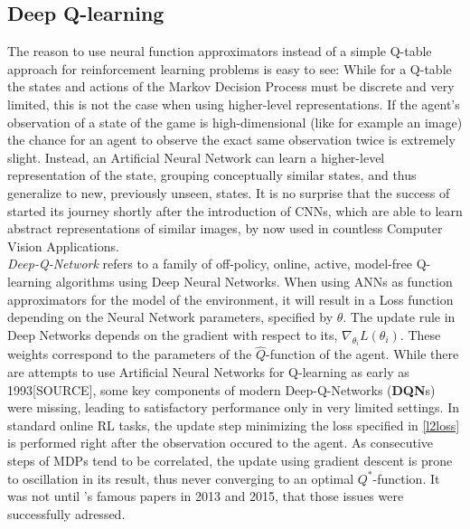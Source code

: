\subsection{Deep Q-learning}

\noindent The reason to use neural function approximators instead of a simple Q-table approach for reinforcement learning problems is easy to see: While for a Q-table the states and actions of the Markov Decision Process must be discrete and very limited, this is not the case when using higher-level representations. If the agent's observation of a state of the game is high-dimensional (like for example an image) the chance for an agent to observe the exact same observation twice is extremely slight. Instead, an Artificial Neural Network can learn a higher-level representation of the state, grouping conceptually similar states, and thus generalize to new, previously unseen, states. It is no surprise that the success of  started its journey shortly after the introduction of CNNs, which are able to learn abstract representations of similar images, by now used in countless Computer Vision Applications. \\%

\textit{Deep-Q-Network} refers to a family of off-policy, online, active, model-free Q-learning algorithms using Deep Neural Networks. %
When using ANNs as function approximators for the model of the environment, it will result in a Loss function depending on the Neural Network parameters, specified by $\theta$. The update rule in Deep Networks depends on the gradient with respect to its, $\nabla_{\theta_i}L(\theta_i)$. These weights correspond to the parameters of the $\hat{Q}$-function of the agent. %
While there are attempts to use Artificial Neural Networks for Q-learning as early as 1993[SOURCE], some key components of modern Deep-Q-Networks (\textbf{DQN}s) were missing, leading to satisfactory performance only in very limited settings. In standard online RL tasks, the update step minimizing the loss specified in \ref{l2loss} is performed right after the observation occured to the agent. As consecutive steps of MDPs tend to be correlated, the update using gradient descent is prone to oscillation in its result, thus never converging to an optimal $Q^*$-function. It was not until 's famous papers in 2013\cite{mnih_playing_2013} and 2015\cite{mnih_human-level_2015}, that those issues were successfully adressed.

